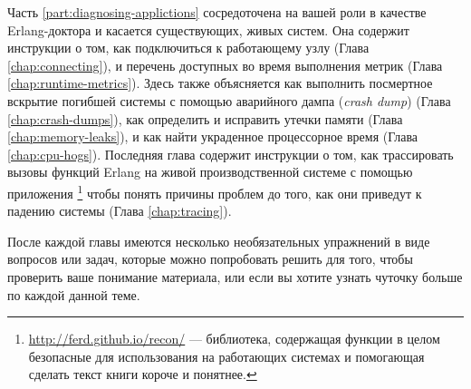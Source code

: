 Часть \ref{part:diagnosing-applictions} сосредоточена на вашей роли в качестве Erlang-доктора и касается существующих, живых систем. Она содержит инструкции о том, как подключиться к работающему узлу (Глава \ref{chap:connecting}), и перечень доступных во время выполнения метрик (Глава \ref{chap:runtime-metrics}). Здесь также объясняется как выполнить посмертное вскрытие погибшей системы с помощью аварийного дампа (\emph{crash dump}) (Глава \ref{chap:crash-dumps}), как определить и исправить утечки памяти (Глава \ref{chap:memory-leaks}), и как найти украденное процессорное время (Глава \ref{chap:cpu-hogs}). Последняя глава содержит инструкции о том, как трассировать вызовы функций Erlang на живой производственной системе с помощью приложения \footnote{\href{http://ferd.github.io/recon/}{http://ferd.github.io/recon/} — библиотека, содержащая функции в целом безопасные для использования на работающих системах и помогающая сделать текст книги короче и понятнее.} чтобы понять причины проблем до того, как они приведут к падению системы (Глава \ref{chap:tracing}).

После каждой главы имеются несколько необязательных упражнений в виде вопросов или задач, которые можно попробовать решить для того, чтобы проверить ваше понимание материала, или если вы хотите узнать чуточку больше по каждой данной теме.
